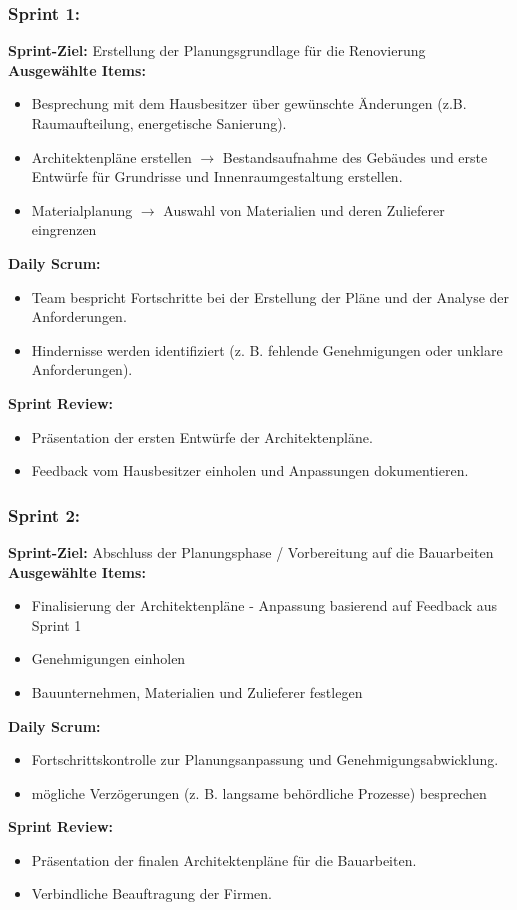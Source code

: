 \subsubsection*{Sprint 1:}

\textbf{Sprint-Ziel:} Erstellung der Planungsgrundlage für die Renovierung\\
\textbf{Ausgewählte Items:}
\begin{itemize}
\item Besprechung mit dem Hausbesitzer über gewünschte Änderungen (z.B. Raumaufteilung, energetische Sanierung).
\item Architektenpläne erstellen $\rightarrow$ Bestandsaufnahme des Gebäudes und erste Entwürfe für Grundrisse und Innenraumgestaltung erstellen.
\item Materialplanung $\rightarrow$ Auswahl von Materialien und deren Zulieferer eingrenzen
\end{itemize}

\textbf{Daily Scrum:}
\begin{itemize}
\item Team bespricht Fortschritte bei der Erstellung der Pläne und der Analyse der Anforderungen.
\item Hindernisse werden identifiziert (z. B. fehlende Genehmigungen oder unklare Anforderungen).
\end{itemize}

\textbf{Sprint Review:}
\begin{itemize}
\item Präsentation der ersten Entwürfe der Architektenpläne.
\item Feedback vom Hausbesitzer einholen und Anpassungen dokumentieren.
\end{itemize}


\subsubsection*{Sprint 2:}

\textbf{Sprint-Ziel:} Abschluss der Planungsphase / Vorbereitung auf die Bauarbeiten\\
\textbf{Ausgewählte Items:}
\begin{itemize}
\item Finalisierung der Architektenpläne - Anpassung basierend auf Feedback aus Sprint 1
\item Genehmigungen einholen
\item Bauunternehmen, Materialien und Zulieferer festlegen
\end{itemize}

\textbf{Daily Scrum:}
\begin{itemize}
\item Fortschrittskontrolle zur Planungsanpassung und Genehmigungsabwicklung.
\item mögliche Verzögerungen (z. B. langsame behördliche Prozesse) besprechen
\end{itemize}

\textbf{Sprint Review:}
\begin{itemize}
\item Präsentation der finalen Architektenpläne für die Bauarbeiten.
\item Verbindliche Beauftragung der Firmen.
\end{itemize}